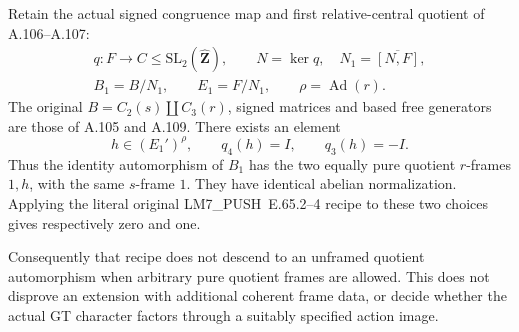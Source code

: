 Retain the actual signed congruence map and first relative-central
quotient of A.106--A.107:
\[
 \begin{gathered}
 q:F\longrightarrow C\leq\mathrm{SL}_2(\widehat{\mathbf Z}),
 \qquad N=\ker q,\quad N_1=\overline{[N,F]},\\
 B_1=B/N_1,\qquad E_1=F/N_1,\qquad \rho=\operatorname{Ad}(r).
 \end{gathered}
\]
The original \(B=C_2(s)\amalg C_3(r)\), signed matrices and
based free generators are those of A.105 and A.109.
There exists an element
\[
 h\in(E_1')^\rho,\qquad q_4(h)=I,\qquad q_3(h)=-I.
 \tag{A.110.1}
\]
Thus the identity automorphism of \(B_1\) has the two equally pure
quotient \(r\)-frames \(1,h\), with the same \(s\)-frame \(1\).
They have identical abelian normalization. Applying the literal
original LM7\_PUSH~E.65.2--4 recipe to these two choices gives
respectively zero and one.

Consequently that recipe does not descend to an unframed quotient
automorphism when arbitrary pure quotient frames are allowed.
This does not disprove an extension with additional coherent frame
data, or decide whether the actual GT character factors through a
suitably specified action image.

